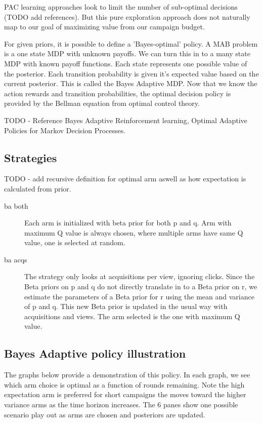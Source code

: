 \documentclass[11pt,a4,singlespacing,titlepagenumber=on]{scrreprt}
\numberwithin{equation}{chapter} %
\theoremstyle{remark}
\begin{document}
PAC learning approaches look to limit the number of sub-optimal decisions (TODO add references). But this pure exploration approach does not naturally map to our goal of maximizing value from our campaign budget.

For given priors, it is possible to define a 'Bayes-optimal' policy. A MAB problem is a one state MDP with unknown payoffs. We can turn this in to a many state MDP with known payoff functions. Each state represents one possible value of the posterior. Each transition probability is given it's expected value based on the current posterior. This is called the Bayes Adaptive MDP. Now that we know the action rewards and transition probabilities, the optimal decision policy is provided by the Bellman equation from optimal control theory.

TODO - Reference Bayes Adaptive Reinforcement learning,
Optimal Adaptive Policies for Markov Decision Processes.






\subsection{Strategies}

TODO - add recursive definition for optimal arm aswell as how expectation is calculated from prior.

\begin{description}
	\item[ba both] Each arm is initialized with beta prior for both p and q. Arm with maximum Q value is always chosen, where multiple arms have same Q value, one is selected at random.
	\item[ba acqs] The strategy only looks at acquisitions per view, ignoring clicks. Since the Beta priors on p and q do not directly translate in to a Beta prior on r, we estimate the parameters of a Beta prior for r using the mean and variance of p and q. This new Beta prior is updated in the usual way with acquisitions and views. The arm selected is the one with maximum Q value.
\end{description}


\subsection{Bayes Adaptive policy illustration}

The graphs below provide a demonstration of this policy. In each graph, we see which arm choice is optimal as a function of rounds remaining. Note the high expectation arm is preferred for short campaigns the moves toward the higher variance arms as the time horizon increases. The 6 panes show one possible scenario play out as arms are chosen and posteriors are updated.
\end{document}
